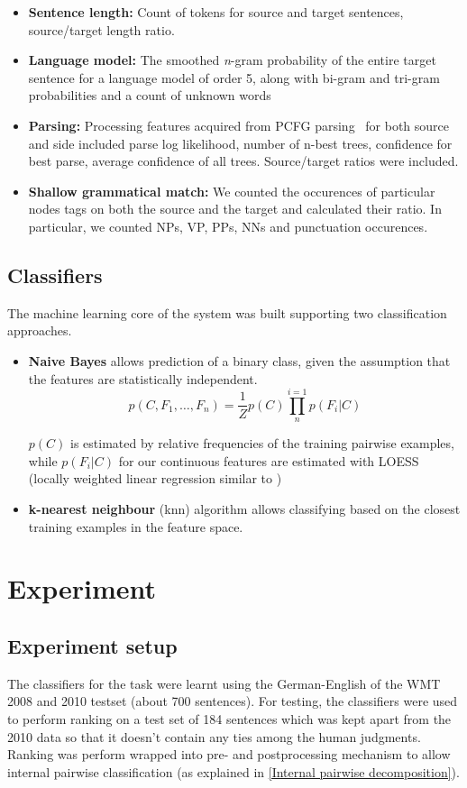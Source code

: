 \documentclass[11pt]{article}
\begin{document}
\begin{itemize}
  \item \textbf{Sentence length:} Count of tokens for source and target
  sentences, source/target length ratio. 
  \item \textbf{Language model:} The smoothed \textit{n}-gram
  probability of the entire target sentence for a language model of order 5,
  along with bi-gram and tri-gram probabilities and a count of unknown words
  \item \textbf{Parsing:} Processing features acquired from PCFG
  parsing~\cite{Petrov06learningaccurate} for both source and side included
  parse log likelihood, number of n-best trees, confidence for best parse,
  average confidence of all trees. Source/target ratios were included.
  \item \textbf{Shallow grammatical match:} We counted the occurences of
  particular nodes tags on both the source and the target and calculated their ratio. In
  particular, we counted NPs, VP, PPs, NNs and punctuation occurences.
\end{itemize}

\subsection{Classifiers}
The machine learning core of the system was built supporting two
classification approaches. 
\begin{itemize}
  \item \textbf{Naive Bayes} allows prediction of a binary class, given the
  assumption that the features are statistically independent. 
  \[
  p(C, F_1, \ldots, F_n) = \frac{1}{Z}p(C)\prod_{n}^{i=1}p(F_i|C)
  \]
  
  \(p(C)\) is estimated by relative frequencies of the training pairwise
  examples, while \(p(F_i|C)\) for our continuous features are
  estimated with LOESS (locally weighted linear regression similar to
  \cite{cleveland1979robust})
  \item \textbf{k-nearest neighbour} (knn) algorithm allows classifying based
  on the closest training examples in the feature space. 
\end{itemize}

\section{Experiment}
\subsection{Experiment setup}
The classifiers for the task were learnt using the German-English
 of the \textsc{WMT} 2008 and 2010 testset (about 700 sentences). For testing,
 the classifiers were used to perform ranking on a test set of 184 sentences
 which was kept apart from the 2010 data so that it doesn't contain any ties
 among the human judgments. Ranking was perform wrapped into pre- and
 postprocessing mechanism to allow internal pairwise classification
 (as explained in \ref{Internal pairwise decomposition}).
 
\end{document}
